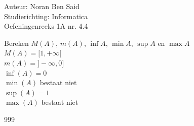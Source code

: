 \documentclass[a4paper]{article}
\begin{document}
  
\noindent \large Auteur: Noran Ben Said \\
\noindent \large Studierichting: Informatica\\
\noindent \large Oefeningenreeks 1A nr. 4.4\\

\medskip

\normalsize

Bereken $M(A)$, $m(A)$, $\inf A$, $\min A$, $\sup A$ en $\max A$\\

$M(A) = [1,+\infty[$\\

$m(A) = ]-\infty, 0]$\\

$\inf(A) = 0$\\

$\min(A)$ bestaat niet\\

$\sup(A) = 1$\\

$\max (A)$ bestaat niet\\

\begin{thebibliography}{999}
\end{thebibliography}
\end{document}
